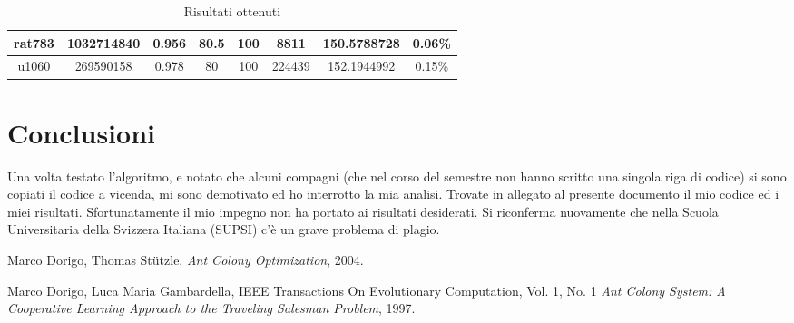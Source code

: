 \documentclass{article}
\begin{document}
\begin{table}[h]
\begin{tabular}{|c|c|c|c|c|c|c|c|}
        rat783           & 1032714840    & 0.956             & 80.5                          & 100          & 8811            & 150.5788728   & 0.06\%                      \\\hline                                                        %
        u1060            & 269590158     & 0.978             & 80                            & 100          & 224439          & 152.1944992   & 0.15\%                      \\\hline
    \end{tabular}
    \caption{Risultati ottenuti}
\end{table}

\section{Conclusioni}

Una volta testato l'algoritmo, e notato che alcuni compagni (che nel corso
del semestre non hanno scritto una singola riga di codice) si sono
copiati il codice a vicenda, mi sono demotivato ed ho interrotto la mia
analisi. Trovate in allegato al presente documento il mio codice ed i 
miei risultati. Sfortunatamente il mio impegno non ha portato 
ai risultati desiderati. Si riconferma nuovamente che nella Scuola
Universitaria della Svizzera Italiana (SUPSI) c'è un grave problema di plagio.

\pagebreak
\begin{thebibliography}{9}
    Marco Dorigo, Thomas Stützle,
    \textit{Ant Colony Optimization}, 2004.

    Marco Dorigo, Luca Maria Gambardella,
    IEEE Transactions On Evolutionary Computation, Vol. 1, No. 1
    \textit{Ant Colony System: A Cooperative Learning Approach to the Traveling Salesman Problem},
    1997.
\end{thebibliography}
\end{document}
